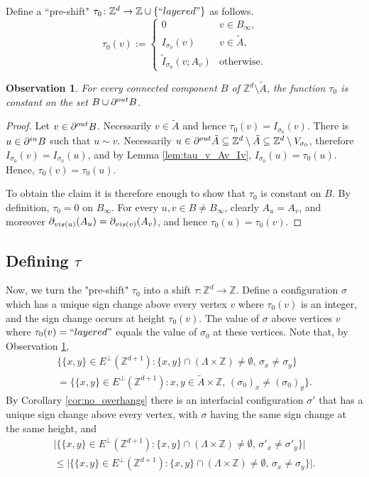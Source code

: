 \documentclass[11pt, reqno]{amsart}
\newtheorem{obs}[theorem]{Observation}
\newcommand{\Z}{\mathbb{Z}}
\numberwithin{equation}{section}
\begin{document}
Define a ``pre-shift" ${\tau}_0\colon {\mathbb Z}^d \to \Z \cup\{{\rm ``layered"}\}$ as follows.
$$
{\tau}_0(v):=\begin{cases}
0 & v\in B_{\infty},\\
I_{\sigma_0}(v) & v\in\tilde{A},\\
\tilde{I}_{\sigma_0}(v;A_v) & \text{otherwise.}
\end{cases}
$$

\begin{obs}\label{obs:s_0_constant}
For every connected component $B$ of ${\mathbb Z}^d\setminus\tilde{A}$, the function ${\tau}_0$ is constant on the set $B\cup \partial^{\rm out}B$.
\end{obs}

\begin{proof}
Let $v\in\partial^{\rm out}B$. Necessarily $v\in\tilde{A}$ and hence $\tau_0(v)=I_{\sigma_0}(v)$.
There is $u\in\partial^{\rm in}B$ such that $u\sim v$. 
Necessarily $u\in\partial^{\rm out}\tilde{A}\subseteq{\mathbb Z}^d\setminus\tilde{A}\subseteq{\mathbb Z}^d\setminus V_{\sigma_0}$, therefore $I_{\sigma_0}(v)=I_{\sigma_0}(u)$, and by  Lemma \ref{lem:tau_v_Av_Iv},
$I_{\sigma_0}(u)=\tau_0(u)$.
Hence, $\tau_0(v)=\tau_0(u)$.

To obtain the claim it is therefore enough to show that $\tau_0$ is constant on $B$.
By definition, $\tau_0=0$ on $B_{\infty}$.
For every $u,v\in B\neq B_{\infty}$, clearly $A_u=A_v$, and moreover  
$\partial_{{\rm vis}(u)}(A_u)=\partial_{{\rm vis}(v)}(A_v)$, and hence $\tau_0(u)=\tau_0(v)$.
\end{proof}

\subsection{Defining $\tau$}
\label{sec:s}
Now, we turn the "pre-shift" ${\tau}_0$ into a shift ${\tau}\colon {\mathbb Z}^d \to{\mathbb Z}$. 
Define a configuration $\sigma$ which has a unique sign change above every vertex $v$ where ${\tau}_0(v)$ is an integer, and the sign change occurs at height ${\tau}_0(v)$. 
The value of $\sigma$ above vertices $v$ where ${\tau}_0(v) = {\rm ``layered"}$ equals the value of $\sigma_0$ at these vertices.
Note that, by Observation \ref{obs:s_0_constant},
\begin{multline}\label{eq:s_0_vs_I}
\{\{x,y\}\in E^{\perp}(\Z^{d+1}) \colon \{x,y\}\cap(\Lambda\times \Z)\neq\emptyset,\, \sigma_x\neq \sigma_y\}\\
=\{\{x,y\}\in E^{\perp}(\Z^{d+1}) \colon x,y\in\tilde{A}\times{\mathbb Z},\, (\sigma_0)_x\neq(\sigma_0)_y\}.
\end{multline}
By Corollary \ref{cor:no_overhangs} there is an interfacial configuration $\sigma'$ that has a unique sign change above every vertex, with $\sigma$ having the same sign change at the same height, and 
\begin{multline}\label{eq:s_vs_s_0}
\lvert\{\{x,y\}\in E^{\perp}(\Z^{d+1}) \colon \{x,y\}\cap(\Lambda\times \Z)\neq\emptyset,\, \sigma'_x\neq\sigma'_y\}\rvert\\
\leq \lvert\{\{x,y\}\in E^{\perp}(\Z^{d+1}) \colon \{x,y\}\cap(\Lambda\times \Z)\neq\emptyset,\, \sigma_x\neq\sigma_y\}\rvert.
\end{multline}
\end{document}
